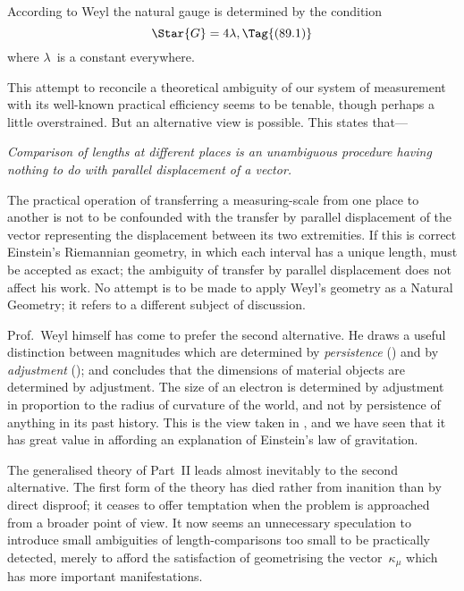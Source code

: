 \documentclass[12pt]{book}
\begin{document}
According to Weyl the natural gauge is determined by the condition
\[
\Star{G} = 4\lambda,
\Tag{(89.1)}
\]
where $\lambda$~is a constant everywhere.

This attempt to reconcile a theoretical ambiguity of our system of
measurement with its well-known practical efficiency seems to be tenable,
though perhaps a little overstrained. But an alternative view is possible.
This states that---

\emph{Comparison of lengths at different places is an unambiguous procedure
having nothing to do with parallel displacement of a vector.}

The practical operation of transferring a measuring-scale from one place
to another is not to be confounded with the transfer by parallel displacement
of the vector representing the displacement between its two extremities. If
this is correct Einstein's Riemannian geometry, in which each interval has
a unique length, must be accepted as exact; the ambiguity of transfer by
parallel displacement does not affect his work. No attempt is to be made to
apply Weyl's geometry as a Natural Geometry; it refers to a different
subject of discussion.

Prof.\ Weyl himself has come to prefer the second alternative. He draws a
%
%
useful distinction between magnitudes which are determined by \emph{persistence}
() and by \emph{adjustment} (); and concludes that the dimensions
of material objects are determined by adjustment. The size of an
electron is determined by adjustment in proportion to the radius of curvature
of the world, and not by persistence of anything in its past history. This is
the view taken in , and we have seen that it has great value in affording
an explanation of Einstein's law of gravitation.

The generalised theory of Part~II leads almost inevitably to the second
alternative. The first form of the theory has died rather from inanition
than by direct disproof; it ceases to offer temptation when the problem is
approached from a broader point of view. It now seems an unnecessary
speculation to introduce small ambiguities of length-comparisons too small
to be practically detected, merely to afford the satisfaction of geometrising
the vector~$\kappa_{\mu}$ which has more important manifestations.
\end{document}
